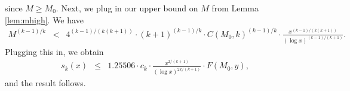 \documentclass[11pt]{amsart}
\newcommand{\p}[1]{\left(#1\right)}
\newcommand{\xm}{\p{\frac{x}{m}}}
\newcommand{\kxm}{\p{\frac{x}{m}}^{\frac{1}{k}}}
\numberwithin{equation}{section}
\numberwithin{algorithm}{section}
\begin{document}
since $M\ge M_0$.
Next, we plug in our upper bound on $M$ from Lemma \ref{lem:mhigh}.
We have
\begin{eqnarray*}
    M^{(k-1)/k} &<& 4^{(k-1)/(k(k+1))}\cdot (k+1)^{(k-1)/k}\cdot 
    C(M_0,k)^{(k-1)/k}\cdot
    \frac{x^{(k-1)/(k(k+1))}}{(\log x)^{(k-1)/(k+1)}}.
\end{eqnarray*}
Plugging this in, we obtain
\begin{eqnarray*}
s_k(x) &\le& 1.25506\cdot c_k   \cdot
 \frac{x^{2/(k+1)}}{(\log x)^{2k/(k+1)}}\cdot F(M_0,y),
\end{eqnarray*}
and the result follows.











\end{document}
